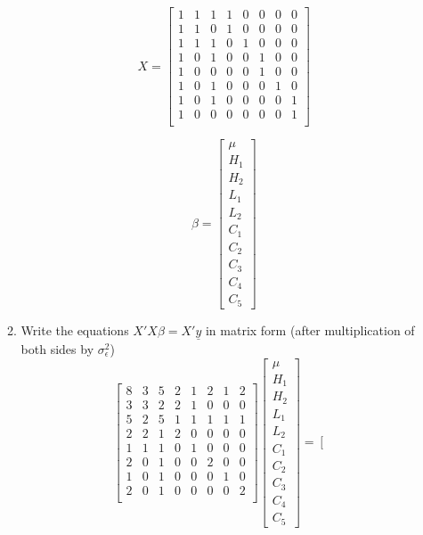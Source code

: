 \documentclass[12pt,a4paper]{paper}
\begin{document}
\begin{enumerate}
\begin{enumerate}
\begin{minipage}[c]{0.2\linewidth}
\end{minipage}
\begin{minipage}[c]{0.5\linewidth}
\[X = \left[\begin{array}{cccccccc}
1 & 1 & 1 & 1 & 0 & 0 & 0 & 0 \\ 
  1 & 1 & 0 & 1 & 0 & 0 & 0 & 0 \\ 
  1 & 1 & 1 & 0 & 1 & 0 & 0 & 0 \\ 
  1 & 0 & 1 & 0 & 0 & 1 & 0 & 0 \\ 
  1 & 0 & 0 & 0 & 0 & 1 & 0 & 0 \\ 
  1 & 0 & 1 & 0 & 0 & 0 & 1 & 0 \\ 
  1 & 0 & 1 & 0 & 0 & 0 & 0 & 1 \\ 
  1 & 0 & 0 & 0 & 0 & 0 & 0 & 1 \\ 
\end{array}\right]\]
\end{minipage}
\begin{minipage}[c]{0.2\linewidth}
\[\beta = \left[\begin{array}{c}\mu\\H_{1}\\H_{2}\\L_{1}\\L_{2}\\C_{1}\\C_{2}\\C_{3}\\C_{4}\\C_{5}\end{array}\right]\]
\end{minipage}
\item Write the equations $X'X\beta = X'\underline{y}$ in matrix form (after multiplication of both sides by $\sigma^{2}_{\epsilon}$)
\[\left[\begin{array}{cccccccc}
8 & 3 & 5 & 2 & 1 & 2 & 1 & 2 \\ 
  3 & 3 & 2 & 2 & 1 & 0 & 0 & 0 \\ 
  5 & 2 & 5 & 1 & 1 & 1 & 1 & 1 \\ 
  2 & 2 & 1 & 2 & 0 & 0 & 0 & 0 \\ 
  1 & 1 & 1 & 0 & 1 & 0 & 0 & 0 \\ 
  2 & 0 & 1 & 0 & 0 & 2 & 0 & 0 \\ 
  1 & 0 & 1 & 0 & 0 & 0 & 1 & 0 \\ 
  2 & 0 & 1 & 0 & 0 & 0 & 0 & 2 \\ 
\end{array}\right]
\left[\begin{array}{c}\mu\\H_{1}\\H_{2}\\L_{1}\\L_{2}\\C_{1}\\C_{2}\\C_{3}\\C_{4}\\C_{5}\end{array}\right] = \left[\begin{array}{cccccccc}

\end{array}\]
\end{enumerate}
\end{enumerate}
\end{document}
